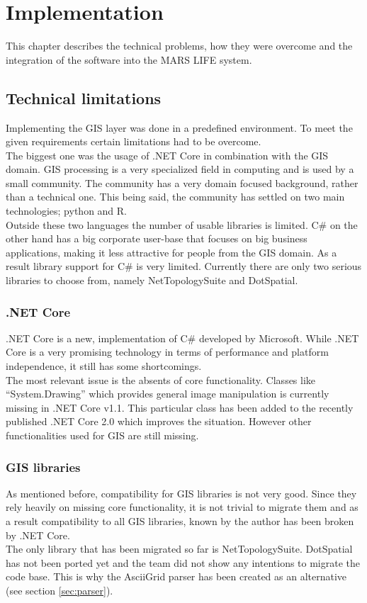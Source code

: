 
\chapter{Implementation}
This chapter describes the technical problems, how they were overcome and the integration of the software into the MARS LIFE system.



\section{Technical limitations}
Implementing the GIS layer was done in a predefined environment. To meet the given requirements certain limitations had to be overcome.\\
The biggest one was the usage of .NET Core in combination with the GIS domain. GIS processing is a very specialized field in computing and is used by a small community. The community has a very domain focused background, rather than a technical one. This being said, the community has settled on two main technologies; python and R.\\
Outside these two languages the number of usable libraries is limited. C\# on the other hand has a big corporate user-base that focuses on big business applications, making it less attractive for people from the GIS domain. As a result library support for C\# is very limited. Currently there are only two serious libraries to choose from, namely NetTopologySuite and DotSpatial.\\


\subsection{.NET Core}
.NET Core is a new, implementation of C\# developed by Microsoft. While .NET Core is a very promising technology in terms of performance and platform independence, it still has some shortcomings.\\
The most relevant issue is the absents of core functionality. Classes like \enquote{System.Drawing} which provides general image manipulation is currently missing in .NET Core v1.1. This particular class has been added to the recently published .NET Core 2.0 which improves the situation. However other functionalities used for GIS are still missing.


\subsection{GIS libraries}
As mentioned before, compatibility for GIS libraries is not very good. Since they rely heavily on missing core functionality, it is not trivial to migrate them and as a result compatibility to all GIS libraries, known by the author has been broken by .NET Core.\\
The only library that has been migrated so far is NetTopologySuite. DotSpatial has not been ported yet and the team did not show any intentions to migrate the code base. This is why the AsciiGrid parser has been created as an alternative (see section \ref{sec:parser}).



